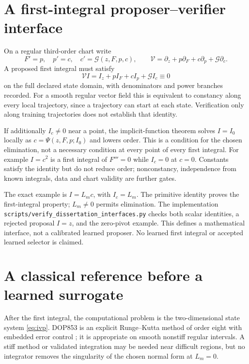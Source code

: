 \documentclass[11pt,a4paper,oneside]{report}
\numberwithin{equation}{chapter}
\DeclareRobustCommand{\code}[1]{\nolinkurl{#1}}
\begin{document}
\section{A first-integral proposer--verifier interface}
On a regular third-order chart write
\begin{equation}
F'=p,\quad p'=c,\quad c'=\mathscr G(z,F,p,c),\qquad
\mathscr V=\partial_z+p\partial_F+c\partial_p+\mathscr G\partial_c.
\end{equation}
A proposed first integral must satisfy
\begin{equation}\label{eq:first-integral-interface}
\boxed{\mathscr V I=I_z+pI_F+cI_p+\mathscr G I_c\equiv0}
\end{equation}
on the full declared state domain, with denominators and power branches
recorded. For a smooth regular vector field this is equivalent to constancy
along every local trajectory, since a trajectory can start at each state.
Verification only along training trajectories does not establish that identity.

If additionally $I_c\ne0$ near a point, the implicit-function theorem
solves $I=I_0$ locally as $c=\Psi(z,F,p;I_0)$ and lowers order.
This is a condition for the chosen elimination, not a necessary condition
at every point of every first integral. For example $I=c^2$ is a first
integral of $F'''=0$ while $I_c=0$ at $c=0$.
Constants satisfy the identity but do not reduce order; nonconstancy,
independence from known integrals, data and chart validity are further gates.

The exact example is $I=L_mc$, with $I_c=L_m$.
The primitive identity proves the first-integral property; $L_m\ne0$
permits elimination. The implementation
\code{scripts/verify_dissertation_interfaces.py} checks both scalar
identities, a rejected proposal $I=z$, and the zero-pivot example.
This defines a mathematical interface, not a calibrated learned proposer.
No learned first integral or accepted learned selector is claimed.

\section{A classical reference before a learned surrogate}
After the first integral, the computational problem is the two-dimensional state system \eqref{eq:ivp}. DOP853 is an explicit Runge--Kutta method of order eight with embedded error control \cite{hairer}; it is appropriate on smooth nonstiff regular intervals. A stiff method or validated integration may be needed near difficult regions, but no integrator removes the singularity of the chosen normal form at $L_m=0$.
\end{document}
